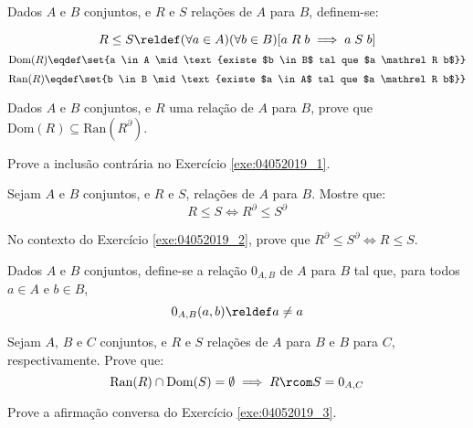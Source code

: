 \begin{definition}
    Dados $A$ e $B$ conjuntos, e $R$ e $S$ relações de $A$ para $B$, definem-se:
    
        $$R \le S \reldef (\forall a \in A )(\forall b \in B )[a \mathrel R b \implies  a \mathrel S b]$$
        $$\text{Dom}(R) \eqdef \set{a \in A \mid \text{existe $b \in B$ tal que $a \mathrel R b$}}$$
        $$\text{Ran}(R) \eqdef \set{b \in B \mid \text{existe $a \in A$ tal que $a \mathrel R b$}}$$
    
\end{definition}

\begin{exercise}
    \label{exe:04052019_1}
    Dados $A$ e $B$ conjuntos, e $R$ uma relação de $A$ para $B$, prove que $\text{Dom}(R) \subseteq \text{Ran}(R^{\partial})$.
\end{exercise}

\begin{homework}
    Prove a inclusão contrária no Exercício \ref{exe:04052019_1}.
\end{homework}

\begin{exercise}
    \label{exe:04052019_2}
    Sejam $A$ e $B$ conjuntos, e $R$ e $S$, relações de $A$ para $B$. Mostre que: $$R \le S \iff R^{\partial} \le S^{\partial}$$
\end{exercise}

\begin{homework}
    No contexto do Exercício \ref{exe:04052019_2}, prove que $R^{\partial} \le S^{\partial} \iff R \le S$.
\end{homework}

\begin{definition}
    Dados $A$ e $B$ conjuntos, define-se a relação $0_{A, B}$ de $A$ para $B$ tal que, para todos $a \in A$ e $b \in B$,
    $$0_{A, B}(a,b) \reldef a \ne a$$
\end{definition}

\begin{exercise}
\label{exe:04052019_3}
    Sejam $A$, $B$ e $C$ conjuntos, e $R$ e $S$ relações de $A$ para $B$ e $B$ para $C$, respectivamente. Prove que:
    $$\text{Ran}(R) \cap \text{Dom}(S) = \emptyset \implies R \rcom S = 0_{A,C}$$
\end{exercise}

\begin{homework}
    Prove a afirmação conversa do Exercício \ref{exe:04052019_3}.
\end{homework}